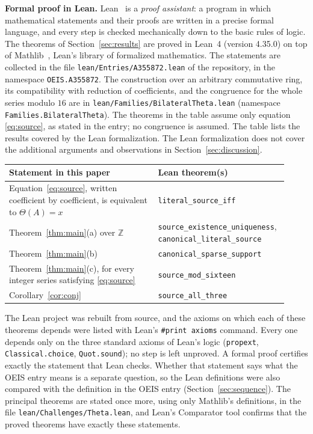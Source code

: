 \documentclass[11pt,a4paper]{article}
\theoremstyle{definition}
\theoremstyle{remark}
\newcommand{\Z}{\mathbb{Z}}
\newcommand{\para}[1]{\par\medskip\noindent\textbf{#1}\enspace}
\begin{document}
\para{Formal proof in Lean.}
Lean~\cite{lean} is a \emph{proof assistant}: a program in which mathematical statements and their proofs are written
in a precise formal language, and every step is checked mechanically down to the basic rules of logic. The theorems of Section~\ref{sec:results} are proved in Lean~4 (version 4.35.0) on top of
Mathlib~\cite{mathlib}, Lean's library of formalized mathematics. The statements are collected in the file \texttt{lean/Entries/A355872.lean} of the repository,
in the namespace \texttt{OEIS.A355872}. The construction over an arbitrary commutative ring, its compatibility with reduction of coefficients,
and the congruence for the whole series modulo $16$ are in \texttt{lean/Families/BilateralTheta.lean} (namespace
\texttt{Families.BilateralTheta}). The theorems in the table assume only equation \eqref{eq:source}, as
stated in the entry; no congruence is assumed.
The table lists the results covered by the Lean formalization. The Lean formalization does not cover the additional arguments and observations in Section~\ref{sec:discussion}.
\begin{center}\small\renewcommand{\arraystretch}{1.25}
\begin{tabular}{>{\raggedright\arraybackslash}p{0.52\linewidth}>{\raggedright\arraybackslash}p{0.4\linewidth}}
\toprule
Statement in this paper & Lean theorem(s)\\
\midrule
Equation~\eqref{eq:source}, written coefficient by coefficient, is equivalent to $\Theta(A)=x$ & \texttt{literal\_\allowbreak{}source\_\allowbreak{}iff} \\
Theorem~\ref{thm:main}(a) over $\Z$ & \texttt{source\_\allowbreak{}existence\_\allowbreak{}uniqueness}, \texttt{canonical\_\allowbreak{}literal\_\allowbreak{}source} \\
Theorem~\ref{thm:main}(b) & \texttt{canonical\_\allowbreak{}sparse\_\allowbreak{}support} \\
Theorem~\ref{thm:main}(c), for every integer series satisfying \eqref{eq:source} & \texttt{source\_\allowbreak{}mod\_\allowbreak{}sixteen} \\
Corollary~\ref{cor:conj} & \texttt{source\_\allowbreak{}all\_\allowbreak{}three} \\
\bottomrule
\end{tabular}
\end{center}
The Lean project was rebuilt from source, and the axioms on which each of these theorems depends were listed with
Lean's \texttt{\#print axioms} command. Every one depends only on the three standard axioms of Lean's logic
(\texttt{propext}, \texttt{Classical.choice}, \texttt{Quot.sound}); no step is left unproved. A formal proof certifies
exactly the statement that Lean checks. Whether that statement says what the OEIS entry means is a separate question,
so the Lean definitions were also compared with the definition in the OEIS entry
(Section~\ref{sec:sequence}). The principal theorems are stated once more, using only Mathlib's definitions, in the
file \texttt{lean/Challenges/Theta.lean}, and Lean's Comparator tool confirms that the
proved theorems have exactly these statements.
\end{document}
